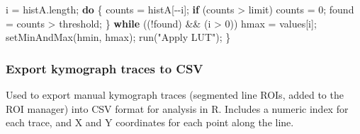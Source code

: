 \documentclass[
  12pt,
  a4paper,
]{book}
\newenvironment{Shaded}{}{}
\newcommand{\ControlFlowTok}[1]{\textcolor[rgb]{0.00,0.44,0.13}{\textbf{#1}}}
\newcommand{\DecValTok}[1]{\textcolor[rgb]{0.25,0.63,0.44}{#1}}
\newcommand{\NormalTok}[1]{#1}
\newcommand{\OperatorTok}[1]{\textcolor[rgb]{0.40,0.40,0.40}{#1}}
\newcommand{\StringTok}[1]{\textcolor[rgb]{0.25,0.44,0.63}{#1}}
\begin{document}
\begin{Shaded}
\begin{Highlighting}[]
\NormalTok{    i }\OperatorTok{=}\NormalTok{ histA}\OperatorTok{.}\NormalTok{length}\OperatorTok{;} 
    \ControlFlowTok{do} \OperatorTok{\{} 
\NormalTok{            counts }\OperatorTok{=}\NormalTok{ histA}\OperatorTok{[{-}{-}}\NormalTok{i}\OperatorTok{];} 
            \ControlFlowTok{if} \OperatorTok{(}\NormalTok{counts }\OperatorTok{\textgreater{}}\NormalTok{ limit}\OperatorTok{)}\NormalTok{ counts }\OperatorTok{=} \DecValTok{0}\OperatorTok{;} 
\NormalTok{            found }\OperatorTok{=}\NormalTok{ counts }\OperatorTok{\textgreater{}}\NormalTok{ threshold}\OperatorTok{;} 
    \OperatorTok{\}} \ControlFlowTok{while} \OperatorTok{((!}\NormalTok{found}\OperatorTok{)} \OperatorTok{\&\&} \OperatorTok{(}\NormalTok{i }\OperatorTok{\textgreater{}} \DecValTok{0}\OperatorTok{))} 
\NormalTok{    hmax }\OperatorTok{=}\NormalTok{ values}\OperatorTok{[}\NormalTok{i}\OperatorTok{];} 
\NormalTok{    setMinAndMax}\OperatorTok{(}\NormalTok{hmin}\OperatorTok{,}\NormalTok{ hmax}\OperatorTok{);} 
\NormalTok{    run}\OperatorTok{(}\StringTok{"Apply LUT"}\OperatorTok{);} 
\OperatorTok{\}}
\end{Highlighting}
\end{Shaded}

\hypertarget{kymo-export}{%
\subsubsection{Export kymograph traces to CSV}\label{kymo-export}}

Used to export manual kymograph traces (segmented line ROIs, added to the ROI manager) into CSV format for analysis in R. Includes a numeric index for each trace, and X and Y coordinates for each point along the line.
\end{document}
